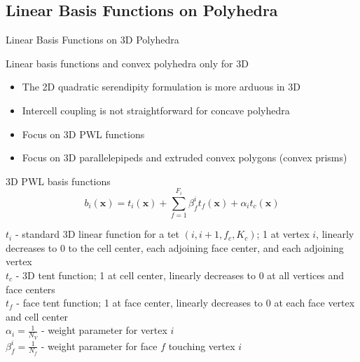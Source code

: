 \documentclass[compress,10pt]{beamer}
\renewcommand{\vec}[1]{\mathbf{#1}}
\begin{document}
\subsection{Linear Basis Functions on Polyhedra}
\begin{frame}[t]{Linear Basis Functions on 3D Polyhedra}
\begin{block}{Linear basis functions and convex polyhedra only for 3D}{\small
\begin{itemize}
\item The 2D quadratic serendipity formulation is more arduous in 3D
\item Intercell coupling is not straightforward for concave polyhedra
\item Focus on 3D PWL functions
\item Focus on 3D parallelepipeds and extruded convex polygons (convex prisms)
\end{itemize}}
\end{block}
\begin{block}{3D PWL basis functions}{\small
\begin{equation*}
b_i (\vec{x})  = t_i  (\vec{x})  + \sum_{f=1}^{F_i} \beta_f^i  t_f (\vec{x}) + \alpha_i t_c  (\vec{x}) 
\end{equation*}
}\end{block}
\begin{block}{}{\footnotesize
$t_i$ - standard 3D linear function for a tet $(i,i+1,f_c,K_c)$; 1 at vertex $i$, linearly decreases to 0 to the cell center, each adjoining face center, and each adjoining vertex\\ \vspace{0.5mm}
$t_c$ - 3D tent function; 1 at cell center, linearly decreases to 0 at all vertices and face centers \\ \vspace{0.5mm}
$t_f$ - face tent function; 1 at face center, linearly decreases to 0 at each face vertex and cell center\\ \vspace{0.5mm}
$\alpha_i = \frac{1}{N_V}$ - weight parameter for vertex $i$\\ \vspace{0.5mm}
$\beta_f^i = \frac{1}{N_f}$ - weight parameter for face $f$ touching vertex $i$
}\end{block}
\end{frame}
\end{document}
